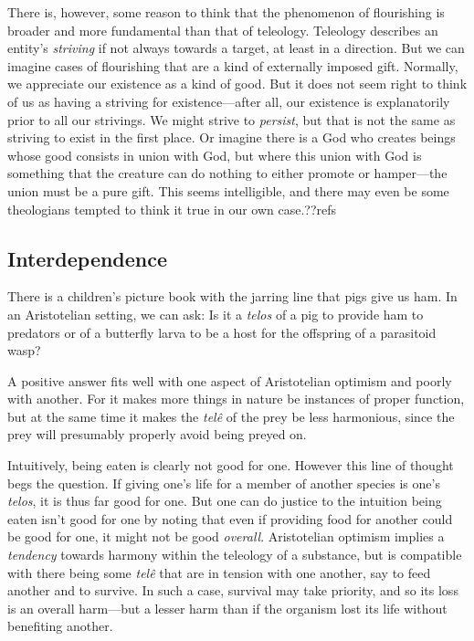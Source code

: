There is, however, some reason to think that the phenomenon of flourishing is broader and more fundamental
than that of teleology. Teleology describes an entity's \textit{striving} if not always towards a target,
at least in a direction. But we can imagine cases of flourishing that are a kind of externally imposed
gift. Normally, we appreciate our existence as a kind of good. But it does not seem right to think of us
as having a striving for existence---after all, our existence is explanatorily prior to all our strivings.
We might strive to \textit{persist}, but that is not the same as striving to exist  in the first place.
Or imagine there is a God who creates beings whose good consists in union with God, but where this
union with God is something that the creature can do nothing to either promote or hamper---the union must 
be a pure gift. This seems intelligible, and there may even be some theologians tempted to think it true
in our own case.??refs

\subsection{Interdependence}
There is a children's picture book with the
jarring line that pigs give us ham. In an Aristotelian setting, we can ask: Is it a \textit{telos} of a pig
to provide ham to predators or of a butterfly larva to be a host for the offspring of a parasitoid wasp? 

A positive answer fits well with one aspect of Aristotelian optimism and poorly with another. For it makes
more things in nature be instances of proper function, but at the same time it makes the \textit{tel\^e} of
the prey be less harmonious, since the prey will presumably properly avoid being preyed on. 

Intuitively,
being eaten is clearly not good for one. However this line of thought begs the question. 
If giving one's life for a member of another species is one's \textit{telos}, it is thus far good for one.
But one can do justice to the intuition being eaten isn't good for one by noting that even if providing
food for another could be good for one, it might not be good \textit{overall}. Aristotelian optimism 
implies a \textit{tendency} towards harmony within the teleology of a substance, but is compatible with
there being some \textit{tel\^e} that are in tension with one another, say to feed another and to survive.
In such a case, survival may take priority, and so its loss is an overall harm---but a lesser harm than if
the organism lost its life without benefiting another. 

